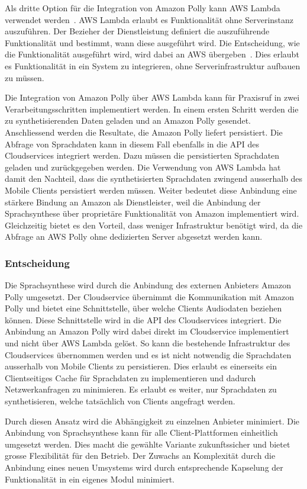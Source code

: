 Als dritte Option für die Integration von Amazon Polly kann AWS Lambda verwendet werden~\cite{aws_polly}.
AWS Lambda erlaubt es Funktionalität ohne Serverinstanz auszuführen.
Der Bezieher der Dienstleistung definiert die auszuführende Funktionalität und bestimmt, wann diese ausgeführt wird.
Die Entscheidung, wie die Funktionalität ausgeführt wird, wird dabei an AWS übergeben~\cite{aws_lambda}.
Dies erlaubt es Funktionalität in ein System zu integrieren, ohne Serverinfrastruktur aufbauen zu müssen.

Die Integration von Amazon Polly über AWS Lambda kann für Praxisruf in zwei Verarbeitungsschritten implementiert werden.
In einem ersten Schritt werden die zu synthetisierenden Daten geladen und an Amazon Polly gesendet.
Anschliessend werden die Resultate, die Amazon Polly liefert persistiert.
Die Abfrage von Sprachdaten kann in diesem Fall ebenfalls in die API des Cloudservices integriert werden.
Dazu müssen die persistierten Sprachdaten geladen und zurückgegeben werden.
Die Verwendung von AWS Lambda hat damit den Nachteil, dass die synthetisierten Sprachdaten zwingend ausserhalb des Mobile Clients persistiert werden müssen.
Weiter bedeutet diese Anbindung eine stärkere Bindung an Amazon als Dienstleister, weil die Anbindung der Sprachsynthese über proprietäre Funktionalität von Amazon implementiert wird.
Gleichzeitig bietet es den Vorteil, dass weniger Infrastruktur benötigt wird, da die Abfrage an AWS Polly ohne dedizierten Server abgesetzt werden kann.

\subsubsection{Entscheidung}

Die Sprachsynthese wird durch die Anbindung des externen Anbieters Amazon Polly umgesetzt.
Der Cloudservice übernimmt die Kommunikation mit Amazon Polly und bietet eine Schnittstelle, über welche Clients Audiodaten beziehen können.
Diese Schnittstelle wird in die API des Cloudservices integriert.
Die Anbindung an Amazon Polly wird dabei direkt im Cloudservice implementiert und nicht über AWS Lambda gelöst.
So kann die bestehende Infrastruktur des Cloudservices übernommen werden und es ist nicht notwendig die Sprachdaten ausserhalb von Mobile Clients zu persistieren.
Dies erlaubt es einerseits ein Clientseitiges Cache für Sprachdaten zu implementieren und dadurch Netzwerkanfragen zu minimieren.
Es erlaubt es weiter, nur Sprachdaten zu synthetisieren, welche tatsächlich von Clients angefragt werden.

Durch diesen Ansatz wird die Abhängigkeit zu einzelnen Anbieter minimiert.
Die Anbindung von Sprachsynthese kann für alle Client-Plattformen einheitlich umgesetzt werden.
Dies macht die gewählte Variante zukunftssicher und bietet grosse Flexibilität für den Betrieb.
Der Zuwachs an Komplexität durch die Anbindung eines neuen Umsystems wird durch entsprechende Kapselung der Funktionalität in ein eigenes Modul minimiert.

\clearpage
